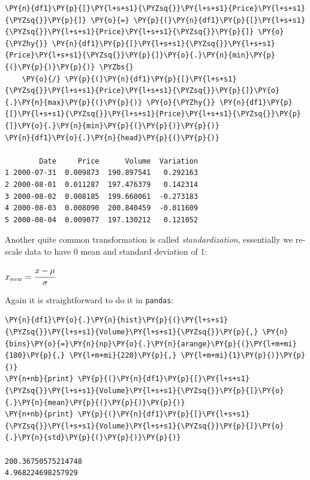 \begin{tcolorbox}[breakable, size=fbox, boxrule=1pt, pad at break*=1mm,colback=cellbackground, colframe=cellborder]
\begin{Verbatim}[commandchars=\\\{\}]
\PY{n}{df1}\PY{p}{[}\PY{l+s+s1}{\PYZsq{}}\PY{l+s+s1}{Price}\PY{l+s+s1}{\PYZsq{}}\PY{p}{]} \PY{o}{=} \PY{p}{(}\PY{n}{df1}\PY{p}{[}\PY{l+s+s1}{\PYZsq{}}\PY{l+s+s1}{Price}\PY{l+s+s1}{\PYZsq{}}\PY{p}{]} \PY{o}{\PYZhy{}} \PY{n}{df1}\PY{p}{[}\PY{l+s+s1}{\PYZsq{}}\PY{l+s+s1}{Price}\PY{l+s+s1}{\PYZsq{}}\PY{p}{]}\PY{o}{.}\PY{n}{min}\PY{p}{(}\PY{p}{)}\PY{p}{)} \PYZbs{}
    \PY{o}{/} \PY{p}{(}\PY{n}{df1}\PY{p}{[}\PY{l+s+s1}{\PYZsq{}}\PY{l+s+s1}{Price}\PY{l+s+s1}{\PYZsq{}}\PY{p}{]}\PY{o}{.}\PY{n}{max}\PY{p}{(}\PY{p}{)} \PY{o}{\PYZhy{}} \PY{n}{df1}\PY{p}{[}\PY{l+s+s1}{\PYZsq{}}\PY{l+s+s1}{Price}\PY{l+s+s1}{\PYZsq{}}\PY{p}{]}\PY{o}{.}\PY{n}{min}\PY{p}{(}\PY{p}{)}\PY{p}{)}
\PY{n}{df1}\PY{o}{.}\PY{n}{head}\PY{p}{(}\PY{p}{)}

        Date     Price      Volume  Variation
1 2000-07-31  0.009873  190.897541   0.292163
2 2000-08-01  0.011287  197.476379   0.142314
3 2000-08-02  0.008185  199.660061  -0.273183
4 2000-08-03  0.008090  200.840459  -0.011609
5 2000-08-04  0.009077  197.130212   0.121052
\end{Verbatim}
\end{tcolorbox}
        
Another quite common transformation is called \emph{standardization}, essentially we re-scale data to have 0 mean and standard deviation of 1:

\(x_{new} = \cfrac{x-\mu}{\sigma}\)

Again it is straightforward to do it in \texttt{pandas}:

\begin{tcolorbox}[breakable, size=fbox, boxrule=1pt, pad at break*=1mm,colback=cellbackground, colframe=cellborder]
\begin{Verbatim}[commandchars=\\\{\}]
\PY{n}{df1}\PY{o}{.}\PY{n}{hist}\PY{p}{(}\PY{l+s+s1}{\PYZsq{}}\PY{l+s+s1}{Volume}\PY{l+s+s1}{\PYZsq{}}\PY{p}{,} \PY{n}{bins}\PY{o}{=}\PY{n}{np}\PY{o}{.}\PY{n}{arange}\PY{p}{(}\PY{l+m+mi}{180}\PY{p}{,} \PY{l+m+mi}{220}\PY{p}{,} \PY{l+m+mi}{1}\PY{p}{)}\PY{p}{)}
\PY{n+nb}{print} \PY{p}{(}\PY{n}{df1}\PY{p}{[}\PY{l+s+s1}{\PYZsq{}}\PY{l+s+s1}{Volume}\PY{l+s+s1}{\PYZsq{}}\PY{p}{]}\PY{o}{.}\PY{n}{mean}\PY{p}{(}\PY{p}{)}\PY{p}{)}
\PY{n+nb}{print} \PY{p}{(}\PY{n}{df1}\PY{p}{[}\PY{l+s+s1}{\PYZsq{}}\PY{l+s+s1}{Volume}\PY{l+s+s1}{\PYZsq{}}\PY{p}{]}\PY{o}{.}\PY{n}{std}\PY{p}{(}\PY{p}{)}\PY{p}{)}

200.36750575214748
4.968224698257929
\end{Verbatim}
\end{tcolorbox}
    \clearpage

